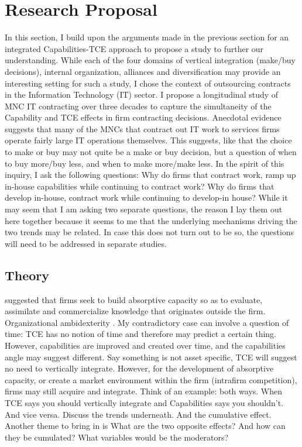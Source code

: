 \documentclass[12pt,letterpaper]{article}
\begin{document}
\section{Research Proposal}
In this section, I build upon the arguments made in the previous section for an integrated Capabilities-TCE approach to propose a study to further our understanding. While each of the four domains of vertical integration (make/buy decisions), internal organization, alliances and diversification may provide an interesting setting for such a study, I chose the context of outsourcing contracts in the Information Technology (IT) sector. I propose a longitudinal study of MNC IT contracting over three decades to capture the simultaneity of the Capability and TCE effects in firm contracting decisions. Anecdotal evidence suggests that many of the MNCs that contract out IT work to services firms operate fairly large IT operations themselves. This suggests, like \cite{Parmigiani2007} that the choice to make or buy may not quite be a make or buy decision, but a question of when to buy more/buy less, and when to make more/make less. In the spirit of this inquiry, I ask the following questions: Why do firms that contract work, ramp up in-house capabilities while continuing to contract work? Why do firms that develop in-house, contract work while continuing to develop-in house? While it may seem that I am asking two separate questions, the reason I lay them out here together because it seems to me that the underlying mechanisms driving the two trends may be related. In case this does not turn out to be so, the questions will need to be addressed in separate studies.

\subsection{Theory}
\cite{Cohen1990} suggested that firms seek to build absorptive capacity so as to evaluate, assimilate and commercialize knowledge that originates outside the firm. Organizational ambidexterity \citep{Raisch2008}. 
My contradictory case can involve a question of time: TCE has no notion of time and therefore may predict a certain thing. However, capabilities are improved and created over time, and the capabilities angle may suggest different. Say something is not asset specific, TCE will suggest no need to vertically integrate. However, for the development of absorptive capacity, or create a market environment within the firm (intrafirm competition), firms may still acquire and integrate. Think of an example: both ways. When TCE says you should vertically integrate and Capabilities says you shouldn't. And vice versa. Discuss the trends underneath. And the cumulative effect. Another theme to bring in is 
What are the two opposite effects? And how can they be cumulated? What variables would be the moderators?
\end{document}
